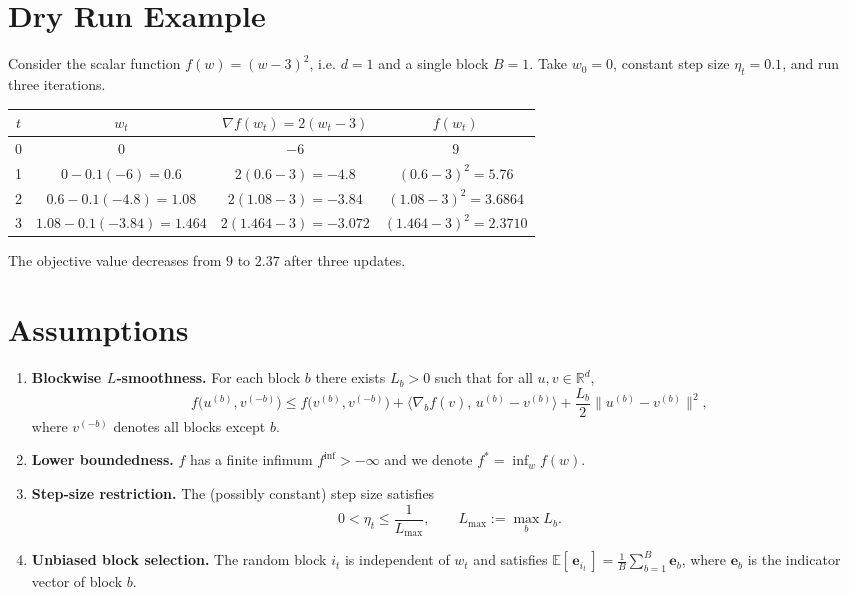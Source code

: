 \documentclass{article}
\begin{document}
\section*{Dry Run Example}
Consider the scalar function $f(w)=(w-3)^{2}$, i.e. $d=1$ and a single block $B=1$.  
Take $w_{0}=0$, constant step size $\eta_{t}=0.1$, and run three iterations.

\begin{tabular}{c|c|c|c}
$t$ & $w_{t}$ & $\nabla f(w_{t})=2(w_{t}-3)$ & $f(w_{t})$\\ \hline
0 & $0$ & $-6$ & $9$\\
1 & $0-0.1(-6)=0.6$ & $2(0.6-3)=-4.8$ & $(0.6-3)^{2}=5.76$\\
2 & $0.6-0.1(-4.8)=1.08$ & $2(1.08-3)=-3.84$ & $(1.08-3)^{2}=3.6864$\\
3 & $1.08-0.1(-3.84)=1.464$ & $2(1.464-3)=-3.072$ & $(1.464-3)^{2}=2.3710$\\
\end{tabular}

The objective value decreases from $9$ to $2.37$ after three updates.

\newpage
\section*{Assumptions}
\begin{enumerate}[label=\textbf{A\arabic*:}, leftmargin=*]
\item \textbf{Blockwise $L$‑smoothness.}  
For each block $b$ there exists $L_{b}>0$ such that for all $u,v\in\mathbb{R}^{d}$,
\[
f\big(u^{(b)},v^{(-b)}\big)\le 
f\big(v^{(b)},v^{(-b)}\big)
+ \langle \nabla_{b}f(v),\,u^{(b)}-v^{(b)}\rangle
+\frac{L_{b}}{2}\|u^{(b)}-v^{(b)}\|^{2},
\tag{1}
\]
where $v^{(-b)}$ denotes all blocks except $b$.
\item \textbf{Lower boundedness.}  
$f$ has a finite infimum $f^{\inf}>-\infty$ and we denote $f^{*}= \inf_{w}f(w)$.
\item \textbf{Step‑size restriction.}  
The (possibly constant) step size satisfies
\[
0<\eta_{t}\le \frac{1}{L_{\max}},\qquad 
L_{\max}:=\max_{b}L_{b}. \tag{2}
\]
\item \textbf{Unbiased block selection.}  
The random block $i_{t}$ is independent of $w_{t}$ and satisfies  
$\mathbb{E}[\,\mathbf{e}_{i_{t}}\,]=\frac{1}{B}\sum_{b=1}^{B}\mathbf{e}_{b}$, where $\mathbf{e}_{b}$ is the indicator vector of block $b$.
\end{enumerate}
\end{document}
